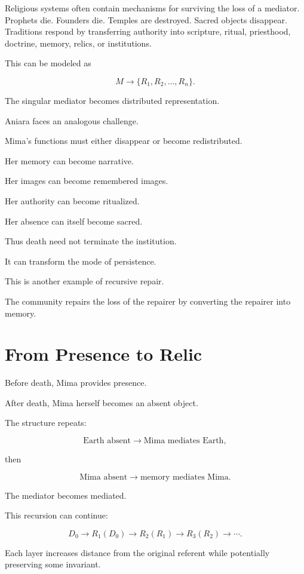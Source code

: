 \documentclass[11pt,oneside]{book}
\theoremstyle{definition}
\theoremstyle{remark}
\begin{document}
Religious systems often contain mechanisms for surviving the loss of a mediator. Prophets die. Founders die. Temples are destroyed. Sacred objects disappear. Traditions respond by transferring authority into scripture, ritual, priesthood, doctrine, memory, relics, or institutions.

This can be modeled as

\[
M
\rightarrow
\{R_1,R_2,\ldots,R_n\}.
\]

The singular mediator becomes distributed representation.

Aniara faces an analogous challenge.

Mima's functions must either disappear or become redistributed.

Her memory can become narrative.

Her images can become remembered images.

Her authority can become ritualized.

Her absence can itself become sacred.

Thus death need not terminate the institution.

It can transform the mode of persistence.

This is another example of recursive repair.

The community repairs the loss of the repairer by converting the repairer into memory.

\section{From Presence to Relic}

Before death, Mima provides presence.

After death, Mima herself becomes an absent object.

The structure repeats:

\[
\text{Earth absent}
\rightarrow
\text{Mima mediates Earth},
\]

then

\[
\text{Mima absent}
\rightarrow
\text{memory mediates Mima}.
\]

The mediator becomes mediated.

This recursion can continue:

\[
D_0
\rightarrow
R_1(D_0)
\rightarrow
R_2(R_1)
\rightarrow
R_3(R_2)
\rightarrow\cdots.
\]

Each layer increases distance from the original referent while potentially preserving some invariant.
\end{document}
